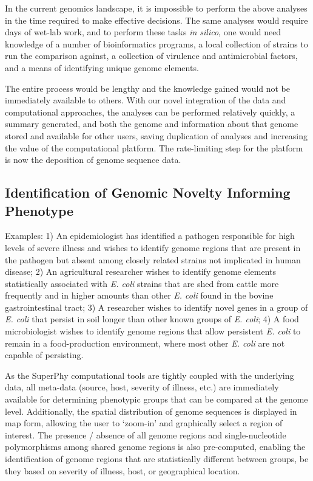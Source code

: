 \documentclass[a4paper,twoside]{article}
\begin{document}
In the current genomics landscape, it is impossible to perform the above analyses in the time required to make effective decisions. The same analyses would require days of wet-lab work, and to perform these tasks \textit{in silico}, one would need knowledge of a number of bioinformatics programs, a local collection of strains to run the comparison against, a collection of virulence and antimicrobial factors, and a means of identifying unique genome elements.

The entire process would be lengthy and the knowledge gained would not be immediately available to others. With our novel integration of the data and computational approaches, the analyses can be performed relatively quickly, a summary generated, and both the genome and
information about that genome stored and available for other users, saving duplication of analyses and increasing the value of the computational platform. The rate-limiting step for the platform is now the deposition of genome sequence data.

\subsection{Identification of Genomic Novelty Informing Phenotype}
Examples: 1) An epidemiologist has identified a pathogen responsible for high levels of severe illness and wishes to identify genome regions that are present in the pathogen but absent among closely related strains not implicated in human disease; 2) An agricultural researcher wishes to identify genome elements statistically associated with \textit{E. coli} strains that are shed from cattle more frequently and in higher amounts than other \textit{E. coli} found in the bovine gastrointestinal tract; 3) A researcher wishes to identify novel genes in a group of \textit{E. coli} that persist in soil longer than other known groups of \textit{E. coli}; 4) A food microbiologist wishes to identify genome regions that allow persistent \textit{E. coli} to remain in a food-production environment, where most other \textit{E. coli} are not capable of persisting.

As the SuperPhy computational tools are tightly coupled with the underlying data, all meta-data (source, host, severity of illness, etc.) are immediately available for determining phenotypic groups that can be compared at the genome level. Additionally, the spatial distribution of genome sequences is displayed in map form, allowing the user to `zoom-in' and graphically select a region of interest. The presence / absence of all genome regions and single-nucleotide polymorphisms among shared genome regions is also pre-computed, enabling the identification of genome regions that are statistically different between groups, be they based on severity of illness, host, or geographical location.
\end{document}
